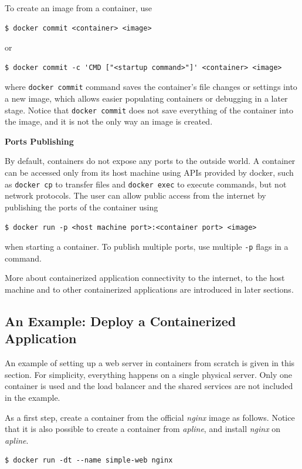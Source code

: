 To create an image from a container, use
\begin{lstlisting}
$ docker commit <container> <image>
\end{lstlisting}
or
\begin{lstlisting}
$ docker commit -c 'CMD ["<startup command>"]' <container> <image>
\end{lstlisting}
where \verb|docker commit| command saves the container's file changes or settings into a new image, which allows easier populating containers or debugging in a later stage. Notice that \verb|docker commit| does not save everything of the container into the image, and it is not the only way an image is created.

\vspace{0.1in}
\noindent \textbf{Ports Publishing}
\vspace{0.1in}

By default, containers do not expose any ports to the outside world. A container can be accessed only from its host machine using APIs provided by docker, such as \verb|docker cp| to transfer files and \verb|docker exec| to execute commands, but not network protocols. The user can allow public access from the internet by publishing the ports of the container using
\begin{lstlisting}
$ docker run -p <host machine port>:<container port> <image>
\end{lstlisting}
when starting a container. To publish multiple ports, use multiple \verb|-p| flags in a command.

More about containerized application connectivity to the internet, to the host machine and to other containerized applications are introduced in later sections.

\subsection{An Example: Deploy a Containerized Application}

An example of setting up a web server in containers from scratch is given in this section. For simplicity, everything happens on a single physical server. Only one container is used and the load balancer and the shared services are not included in the example.

As a first step, create a container from the official \textit{nginx} image as follows. Notice that it is also possible to create a container from \textit{apline}, and install \textit{nginx} on \textit{apline}.
\begin{lstlisting}
$ docker run -dt --name simple-web nginx
\end{lstlisting}

